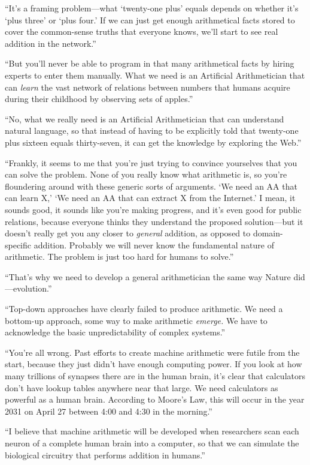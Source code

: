 {
 ``It's a framing problem---what
`twenty-one plus' equals depends on
whether it's `plus
three' or `plus four.'
If we can just get enough arithmetical facts stored to cover the
common-sense truths that everyone knows, we'll start to
see real addition in the network.''}

{
 ``But you'll never be able to
program in that many arithmetical facts by hiring experts to enter them
manually. What we need is an Artificial Arithmetician that can
\textit{learn} the vast network of relations between numbers that
humans acquire during their childhood by observing sets of
apples.''}

{
 ``No, what we really need is an Artificial
Arithmetician that can understand natural language, so that instead of
having to be explicitly told that twenty-one plus sixteen equals
thirty-seven, it can get the knowledge by exploring the
Web.''}

{
 ``Frankly, it seems to me that
you're just trying to convince yourselves that you can
solve the problem. None of you really know what arithmetic is, so
you're floundering around with these generic sorts of
arguments. `We need an AA that can learn
X,' `We need an AA that can extract X
from the Internet.' I mean, it sounds good, it sounds
like you're making progress, and it's
even good for public relations, because everyone thinks they understand
the proposed solution---but it doesn't really get you
any closer to \textit{general} addition, as opposed to domain-specific
addition. Probably we will never know the fundamental nature of
arithmetic. The problem is just too hard for humans to
solve.''}

{
 ``That's why we need to develop a
general arithmetician the same way Nature
did---evolution.''}

{
 ``Top-down approaches have clearly failed to
produce arithmetic. We need a bottom-up approach, some way to make
arithmetic \textit{emerge.} We have to acknowledge the basic
unpredictability of complex systems.''}

{
 ``You're all wrong. Past efforts
to create machine arithmetic were futile from the start, because they
just didn't have enough computing power. If you look at
how many trillions of synapses there are in the human brain,
it's clear that calculators don't have
lookup tables anywhere near that large. We need calculators as powerful
as a human brain. According to Moore's Law, this will
occur in the year 2031 on April 27 between 4:00 and 4:30 in the
morning.''}

{
 ``I believe that machine arithmetic will be
developed when researchers scan each neuron of a complete human brain
into a computer, so that we can simulate the biological circuitry that
performs addition in humans.''}

